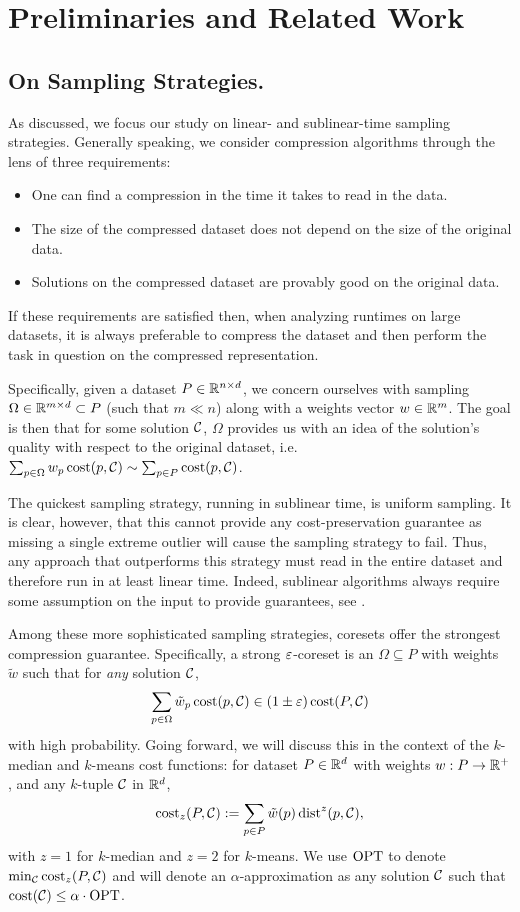\section{Preliminaries and Related Work}
\label{sec:preliminaries}

\subsection{On Sampling Strategies.}
\label{ssec:sens_sampling}

As discussed, we focus our study on linear- and sublinear-time sampling strategies. Generally speaking, we consider compression algorithms through the lens of
three requirements: 
\begin{itemize}
    \item One can find a compression in the time it takes to read in the data.
    \item The size of the compressed dataset does not depend on the size of the original data.
    \item Solutions on the compressed dataset are provably good on the original data.
\end{itemize}
If these requirements are satisfied then, when analyzing runtimes on large datasets, it is always preferable to compress the dataset and then perform the task
in question on the compressed representation.

Specifically, given a dataset $P \in \mathbb{R}^{n \times d}$, we concern ourselves with sampling $\Omega \in \mathbb{R}^{m \times d} \subset P$ (such that $m \ll n$) along
with a weights vector $w \in \mathbb{R}^m$. The goal is then that for some solution $\mathcal C$, $\Omega$ provides us with an idea of the solution's quality with respect to
the original dataset, i.e. $\sum_{p \in \Omega} w_p \operatorname{cost}(p, \mathcal C) \sim \sum_{p \in P} \operatorname{cost}(p, \mathcal C)$.

The quickest sampling strategy, running in sublinear time, is uniform sampling. It is clear, however, that this cannot provide any cost-preservation guarantee
as missing a single extreme outlier will cause the sampling strategy to fail. Thus, any approach that outperforms this strategy must read in the entire dataset
and therefore run in at least linear time. Indeed, sublinear algorithms always require some assumption on the input to provide guarantees, see
\cite{Ben-David07,czumaj2007sublinear,HJJ23,meyerson2004k}.

Among these more sophisticated sampling strategies, coresets offer the strongest compression guarantee. Specifically, a strong $\varepsilon$-coreset is an $\Omega
\subseteq P$ with weights $\tilde w$ such that for \emph{any} solution $\mathcal C$, \[\sum_{p \in \Omega} \tilde w_p \operatorname{cost}(p, \mathcal C) \in (1 \pm \varepsilon) \operatorname{cost}(P,
\mathcal C)\] with high probability.  Going forward, we will discuss this in the context of the $k$-median and $k$-means cost functions: for dataset $P \in \mathbb{R}^d$
with weights $w : P \rightarrow \mathbb{R}^+$, and any $k$-tuple $\mathcal C$ in $\mathbb{R}^d$, \[\operatorname{cost}_z(P, \mathcal C) := \sum_{p \in P} \tilde w(p) \operatorname{dist}^z(p, \mathcal C),\] with $z=1$
for $k$-median and $z=2$ for $k$-means. We use $\text{OPT}$ to denote $\min_{\mathcal C} \operatorname{cost}_z(P, \mathcal C)$ and will denote an $\alpha$-approximation as any solution
$\mathcal C$ such that $\operatorname{cost}(\mathcal C) \leq \alpha \cdot \text{OPT}$.

